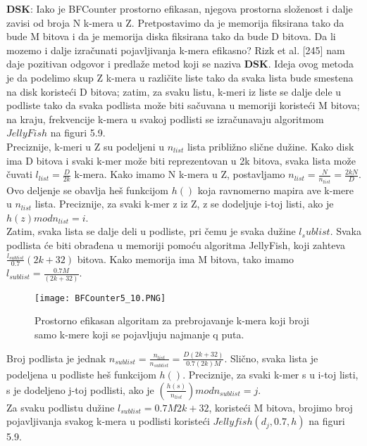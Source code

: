 \documentclass{article}
\begin{document}
\textbf{DSK}: Iako je BFCounter prostorno efikasan, njegova prostorna složenost i dalje zavisi od broja N k-mera u Z. Pretpostavimo da je memorija fiksirana tako da bude M bitova i da je memorija diska fiksirana tako da bude D bitova. Da li mozemo i dalje izračunati pojavljivanja k-mera efikasno? Rizk et al. [245] nam daje pozitivan odgovor i predlaže metod koji se naziva \textbf{DSK}. Ideja ovog metoda je da podelimo skup Z k-mera u različite liste tako da svaka lista bude smestena na disk koristeći D bitova; zatim, za svaku listu, k-meri iz liste se dalje dele u podliste tako da svaka podlista može biti sačuvana u memoriji koristeći M bitova; na kraju, frekvencije k-mera u svakoj podlisti se izračunavaju algoritmom $JellyFish$ na figuri 5.9. \\

Preciznije, k-meri u Z su podeljeni u $n_{list}$ lista približno slične dužine. Kako disk ima D bitova i svaki k-mer može biti reprezentovan u 2k bitova, svaka lista može čuvati $l_{list} =  \frac{D}{2k}$ k-mera. Kako imamo N k-mera u Z, postavljamo $n_{list} = \frac{N}{n_{list}} = \frac{2kN}{D}$. Ovo deljenje se obavlja heš funkcijom $h()$ koja ravnomerno mapira ave k-mere u $n_{list}$ lista. Preciznije, za svaki k-mer z iz Z, z se dodeljuje i-toj listi, ako je $h(z) mod n_{list} = i$. \\

Zatim, svaka lista se dalje deli u podliste, pri čemu je svaka dužine $l_sublist$. Svaka podlista će biti obrađena u memoriji pomoću algoritma JellyFish, koji zahteva $\frac{l_{sublist}}{0.7}(2k +32)$ bitova. Kako memorija ima M bitova, tako imamo $l_{sublist} = \frac{0.7M}{(2k + 32)}$. \\

\begin{figure}[h]
\texttt{[image: BFCounter5\_10.PNG]}
\caption{Prostorno efikasan algoritam za prebrojavanje k-mera koji broji samo k-mere koji se pojavljuju najmanje q puta.}
\end{figure}

Broj podlista je jednak $n_{sublist} = \frac{n_{list}}{n_{sublist}} = \frac{D(2k + 32)}{0.7(2k)M}$. Slično, svaka lista je podeljena u podliste heš funkcijom $h()$. Preciznije, za svaki k-mer s u i-toj listi, s je dodeljeno j-toj podlisti, ako je $(\frac{h(s)}{n_{list}}) mod n_{sublist} = j$. \\

Za svaku podlistu dužine $l_{sublist} = {0.7M}{2k + 32}$, koristeći M bitova,  brojimo broj pojavljivanja svakog k-mera u podlisti koristeći $Jellyfish(d_j, 0.7, h)$ na figuri 5.9. \\ 
\end{document}
